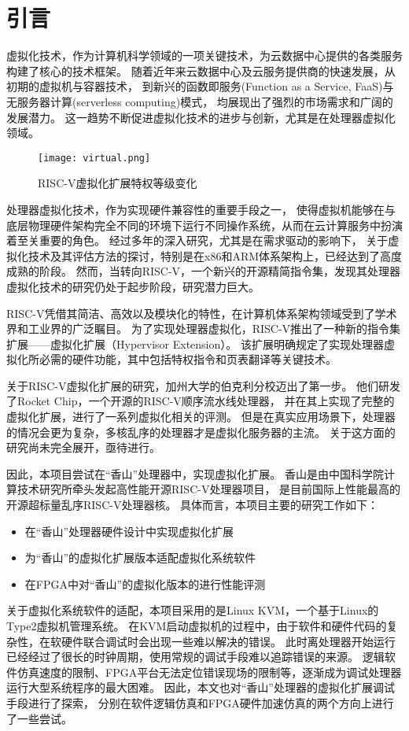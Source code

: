 \chapter{引言}
虚拟化技术，作为计算机科学领域的一项关键技术，为云数据中心提供的各类服务构建了核心的技术框架。
随着近年来云数据中心及云服务提供商的快速发展，从初期的虚拟机与容器技术，
到新兴的函数即服务(Function as a Service, FaaS)与无服务器计算(serverless computing)模式，
均展现出了强烈的市场需求和广阔的发展潜力。
这一趋势不断促进虚拟化技术的进步与创新，尤其是在处理器虚拟化领域。

\begin{figure}[htbp]
    \centering
    \texttt{[image: virtual.png]}
    \caption{RISC-V虚拟化扩展特权等级变化}
\end{figure}

处理器虚拟化技术，作为实现硬件兼容性的重要手段之一，
使得虚拟机能够在与底层物理硬件架构完全不同的环境下运行不同操作系统，从而在云计算服务中扮演着至关重要的角色。
经过多年的深入研究，尤其是在需求驱动的影响下，
关于虚拟化技术及其评估方法的探讨，特别是在x86和ARM体系架构上，已经达到了高度成熟的阶段。
然而，当转向RISC-V，一个新兴的开源精简指令集，发现其处理器虚拟化技术的研究仍处于起步阶段，研究潜力巨大。

RISC-V凭借其简洁、高效以及模块化的特性，在计算机体系架构领域受到了学术界和工业界的广泛瞩目。
为了实现处理器虚拟化，RISC-V推出了一种新的指令集扩展——虚拟化扩展（Hypervisor Extension）。
该扩展明确规定了实现处理器虚拟化所必需的硬件功能，其中包括特权指令和页表翻译等关键技术。

关于RISC-V虚拟化扩展的研究，加州大学的伯克利分校迈出了第一步。
他们研发了Rocket Chip，一个开源的RISC-V顺序流水线处理器，
并在其上实现了完整的虚拟化扩展，进行了一系列虚拟化相关的评测。
但是在真实应用场景下，处理器的情况会更为复杂，多核乱序的处理器才是虚拟化服务器的主流。
关于这方面的研究尚未完全展开，亟待进行。

因此，本项目尝试在“香山”处理器中，实现虚拟化扩展。
香山是由中国科学院计算技术研究所牵头发起高性能开源RISC-V处理器项目，
是目前国际上性能最高的开源超标量乱序RISC-V处理器核。
具体而言，本项目主要的研究工作如下：

\begin{itemize}
\item 在“香山”处理器硬件设计中实现虚拟化扩展
\item 为“香山”的虚拟化扩展版本适配虚拟化系统软件
\item 在FPGA中对“香山”的虚拟化版本的进行性能评测
\end{itemize}

关于虚拟化系统软件的适配，本项目采用的是Linux KVM，一个基于Linux的Type2虚拟机管理系统。
在KVM启动虚拟机的过程中，由于软件和硬件代码的复杂性，在软硬件联合调试时会出现一些难以解决的错误。
此时离处理器开始运行已经经过了很长的时钟周期，使用常规的调试手段难以追踪错误的来源。
逻辑软件仿真速度的限制、FPGA平台无法定位错误现场的限制等，逐渐成为调试处理器运行大型系统程序的最大困难。
因此，本文也对“香山”处理器的虚拟化扩展调试手段进行了探索，
分别在软件逻辑仿真和FPGA硬件加速仿真的两个方向上进行了一些尝试。